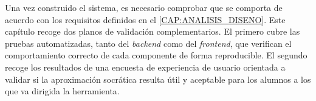 Una vez construido el sistema, es necesario comprobar que se comporta de acuerdo con los requisitos definidos en el \autoref{CAP:ANALISIS_DISENO}. Este capítulo recoge dos planos de validación complementarios. El primero cubre las pruebas automatizadas, tanto del \textit{backend} como del \textit{frontend}, que verifican el comportamiento correcto de cada componente de forma reproducible. El segundo recoge los resultados de una encuesta de experiencia de usuario orientada a validar si la aproximación socrática resulta útil y aceptable para los alumnos a los que va dirigida la herramienta.
